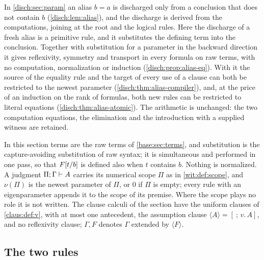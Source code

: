 In \cref{disch:sec:param} an alias $b=a$ is discharged only from a
conclusion that does not contain $b$ (\cref{disch:lem:alias}), and the
discharge is derived from the computations, joining at the root and the
logical rules. Here the discharge of a fresh alias is a primitive rule, and
it substitutes the defining term into the conclusion. Together with
substitution for a parameter in the backward direction it gives
reflexivity, symmetry and transport in every formula on raw terms, with no
computation, normalization or induction (\cref{disch:prop:alias-eq}). With
it the source of the equality rule and the target of every use of a clause
can both be restricted to the newest parameter
(\cref{disch:thm:alias-compiler}), and, at the price of an induction on the
rank of formulas, both new rules can be restricted to literal equations
(\cref{disch:thm:alias-atomic}). The arithmetic is unchanged: the two
computation equations, the elimination  and the introduction
 with a supplied witness are retained.

In this section terms are the raw terms of \cref{base:sec:terms}, and
substitution is the capture-avoiding substitution of raw syntax; it is
simultaneous and performed in one pass, so that $F[t/b]$ is defined
also when $t$ contains $b$. Nothing is normalized. A judgment
$\Pi;\Gamma\vdash A$ carries its numerical scope $\Pi$ as in
\cref{wit:def:scope}, and $\nu(\Pi)$ is the newest parameter of $\Pi$, or
$0$ if $\Pi$ is empty; every rule with an eigenparameter appends it to the
scope of its premise. Where the scope plays no role it is not written. The
clause calculi of the section have the uniform clauses of
\cref{claus:def:v}, with at most one antecedent, the assumption clause
$\langle A\rangle=[\ ;\,v.\,A]$, and no reflexivity clause; $\Gamma,F$
denotes $\Gamma$ extended by $\langle F\rangle$.

\subsection{The two rules}
\label{disch:sec:alias-rules}

